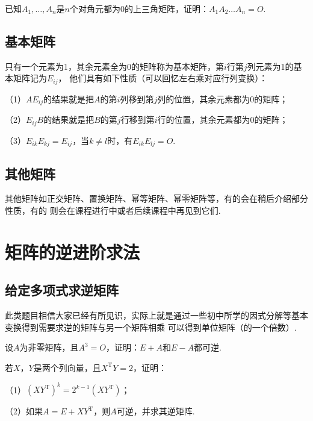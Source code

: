 \begin{example}
	已知$A_1,\dots,A_n$是$n$个对角元都为$0$的上三角矩阵，证明：$A_1A_2\dots A_n=O$.
\end{example}

\subsection{基本矩阵}
只有一个元素为1，其余元素全为0的矩阵称为基本矩阵，第$i$行第$j$列元素为1的基本矩阵记为$E_{ij}$，
他们具有如下性质（可以回忆左右乘对应行列变换）：
\begin{theorem}

	\textup{（1）}$AE_{ij}$的结果就是把$A$的第$i$列移到第$j$列的位置，其余元素都为$0$的矩阵；
	
	\textup{（2）}$E_{ij}B$的结果就是把$B$的第$j$行移到第$i$行的位置，其余元素都为$0$的矩阵；
	
	\textup{（3）}$E_{ik}E_{kj}=E_{ij}$，当$k \neq l$时，有$E_{ik}E_{lj}=O$.
\end{theorem}

\subsection{其他矩阵}
其他矩阵如正交矩阵、置换矩阵、幂等矩阵、幂零矩阵等，有的会在稍后介绍部分性质，有的
则会在课程进行中或者后续课程中再见到它们.

\section{矩阵的逆进阶求法}
\subsection{给定多项式求逆矩阵}
此类题目相信大家已经有所见识，实际上就是通过一些初中所学的因式分解等基本变换得到需要求逆的矩阵与另一个矩阵相乘
可以得到单位矩阵（的一个倍数）.
\begin{example}
	设$A$为非零矩阵，且$A^3=O$，证明：$E+A$和$E-A$都可逆.
\end{example}

\begin{example}
	若$X$，$Y$是两个列向量，且$X^\mathrm{T}Y=2$，证明：

	\textup{（1）}$(XY^\mathrm{T})^k=2^{k-1}(XY^{\mathrm{T}})$；

	\textup{（2）}如果$A=E+XY^\mathrm{T}$，则$A$可逆，并求其逆矩阵.

\end{example}

